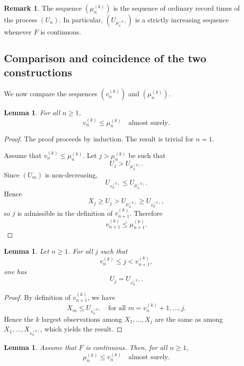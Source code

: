 \documentclass[12pt]{article}
\newtheorem{lemma}[theorem]{Lemma}
\theoremstyle{definition}
\newtheorem{remark}[theorem]{Remark}
\begin{document}
\begin{remark}
\label{rem:interpretation-Un-records}
The sequence $(\mu_n^{(k)})$ is the sequence of ordinary record times of the process $(U_n)$. In particular, $(U_{\mu_n^{(k)}})$ is a strictly increasing sequence whenever $F$ is continuous.
\end{remark}
\subsection{Comparison and coincidence of the two constructions}
\label{subsec:comparison-times}

We now compare the sequences $(v_n^{(k)})$ and $(\mu_n^{(k)})$.

\begin{lemma}
\label{lem:vn-le-mun}
For all $n\ge1$,
\[
v_n^{(k)} \le \mu_n^{(k)} \quad \text{almost surely}.
\]
\end{lemma}

\begin{proof}
The proof proceeds by induction. The result is trivial for $n=1$.

Assume that $v_n^{(k)} \le \mu_n^{(k)}$. Let $j>\mu_n^{(k)}$ be such that
\[
U_j>U_{\mu_n^{(k)}}.
\]
Since $(U_m)$ is non-decreasing,
\[
U_{v_n^{(k)}} \le U_{\mu_n^{(k)}}.
\]
Hence
\[
X_j \ge U_j > U_{\mu_n^{(k)}} \ge U_{v_n^{(k)}},
\]
so $j$ is admissible in the definition of $v_{n+1}^{(k)}$. Therefore
\[
v_{n+1}^{(k)} \le \mu_{n+1}^{(k)}.
\]
\end{proof}

\medskip

\begin{lemma}
\label{lem:Un-constant-between-records}
Let $n\ge1$. For all $j$ such that
\[
v_n^{(k)} \le j < v_{n+1}^{(k)},
\]
one has
\[
U_j = U_{v_n^{(k)}}.
\]
\end{lemma}

\begin{proof}
By definition of $v_{n+1}^{(k)}$, we have
\[
X_m \le U_{v_n^{(k)}} \quad \text{for all } m=v_n^{(k)}+1,\dots,j.
\]
Hence the $k$ largest observations among $X_1,\dots,X_j$ are the same as among $X_1,\dots,X_{v_n^{(k)}}$, which yields the result.
\end{proof}

\medskip

\begin{lemma}
\label{lem:mun-le-vn}
Assume that $F$ is continuous. Then, for all $n\ge1$,
\[
\mu_n^{(k)} \le v_n^{(k)} \quad \text{almost surely}.
\]
\end{lemma}
\end{document}
